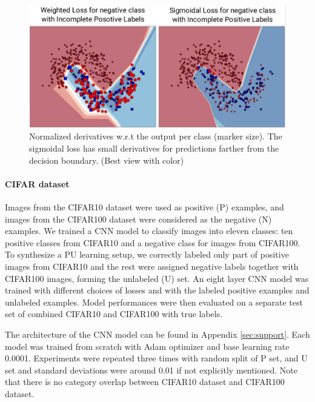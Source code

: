\begin{figure}[t]
\begin{center}
   \includegraphics[width=\linewidth]{img/moons_diff}
\end{center}
   \caption{
   Normalized derivatives w.r.t the output per class (marker size).
   The sigmoidal loss has small derivatives for predictions farther from the decision boundary.
   (Best view with color)
   }
\label{fig:moonsdiff}
\end{figure}

\paragraph{CIFAR dataset}

Images from the CIFAR10 dataset were used as positive (P) examples, and images from the CIFAR100 dataset were considered as the negative (N) examples.
We trained a CNN model to classify images into eleven classes: ten positive classes from CIFAR10 and a negative class for images from CIFAR100.
To synthesize a PU learning setup, we correctly labeled only part of positive images from CIFAR10 and the rest were assigned negative labels together with CIFAR100 images, forming the unlabeled (U) set.
An eight layer CNN model was trained with different choices of losses and with the labeled positive examples and unlabeled examples.
Model performances were then evaluated on a separate test set of combined CIFAR10 and CIFAR100 with true labels.

The architecture of the CNN model can be found in Appendix \ref{sec:support}.
Each model was trained from scratch with Adam optimizer and base learning rate 0.0001.
Experiments were repeated three times with random split of P set, and U set and standard deviations were around 0.01 if not explicitly mentioned.
Note that there is no category overlap between CIFAR10 dataset and CIFAR100 dataset.

